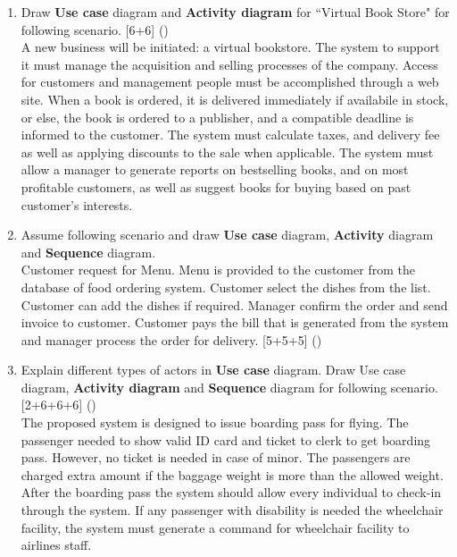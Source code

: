 \documentclass[12pt]{article}
\begin{document}
\begin{enumerate}
      \item Draw \textbf{Use case} diagram and \textbf{Activity diagram} for ``Virtual Book Store" for following scenario. \hfill [6+6] ()\\
        A new business will be initiated: a virtual bookstore. The system to support it must manage the acquisition and selling processes of the company. Access for customers and management people must be accomplished through a web site. When a book is ordered, it is delivered immediately if availabile in stock, or else, the book is ordered to a publisher, and a compatible deadline is informed to the customer. The system must calculate taxes, and delivery fee as well as applying discounts to the sale when applicable. The system must allow a manager to generate reports on bestselling books, and on most profitable customers, as well as suggest books for buying based on past customer's interests.

      \item Assume following scenario and draw \textbf{Use case} diagram, \textbf{Activity} diagram and \textbf{Sequence} diagram.\\
        Customer request for Menu. Menu is provided to the customer from the database of food ordering system. Customer select the dishes from the list. Customer can add the dishes if required. Manager confirm the order and send invoice to customer. Customer pays the bill that is generated from the system and manager process the order for delivery. \hfill [5+5+5] ()

      \item Explain different types of actors in \textbf{Use case} diagram. Draw Use case diagram, \textbf{Activity diagram} and \textbf{Sequence} diagram for following scenario. \hfill [2+6+6+6] ()\\
        The proposed system is designed to issue boarding pass for flying. The passenger needed to show valid ID card and ticket to clerk to get boarding pass. However, no ticket is needed in case of minor. The passengers are charged extra amount if the baggage weight is more than the allowed weight. After the boarding pass the system should allow every individual to check-in through the system. If any passenger with disability is needed the wheelchair facility, the system must generate a command for wheelchair facility to airlines staff.


\end{enumerate}
\end{document}
